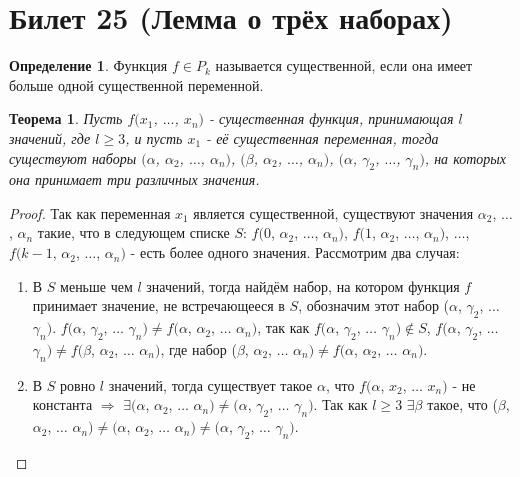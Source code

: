 \documentclass[a4paper, 12pt]{article}
\theoremstyle{definition}
\newtheorem*{definition}{Определение}
\theoremstyle{plain}
\newtheorem*{theorem}{Теорема}
\theoremstyle{remark}
\begin{document}
  \section{Билет 25 (Лемма о трёх наборах)}
  \begin{definition}
    Функция $f\in P_k$ называется существенной, если она имеет больше одной существенной переменной.
  \end{definition}
  \begin{theorem}
    Пусть $f(x_1$, $\ldots$, $x_n)$ - существенная функция, принимающая $l$ значений, где $l\geqslant3$, и пусть $x_1$ - её существенная переменная, тогда существуют наборы $(\alpha$, $\alpha_2$, $\ldots$, $\alpha_n)$, $(\beta$, $\alpha_2$, $\ldots$, $\alpha_n)$, $(\alpha$, $\gamma_2$, $\ldots$, $\gamma_n)$, на которых она принимает три различных значения.
  \end{theorem}
  \begin{proof}
    Так как переменная $x_1$ является существенной, существуют значения $\alpha_2$, $\ldots$, $\alpha_n$ такие, что в следующем списке $S$: $f(0$, $\alpha_2$, $\ldots$, $\alpha_n)$, $f(1$, $\alpha_2$, $\ldots$, $\alpha_n)$, $\ldots$, $f(k-1$, $\alpha_2$, $\ldots$, $\alpha_n)$ - есть более одного значения. Рассмотрим два случая:
    \begin{enumerate}
      \item В $S$ меньше чем $l$ значений, тогда найдём набор, на котором функция $f$ принимает значение, не встречающееся в $S$, обозначим этот набор ($\alpha$, $\gamma_2$, $\ldots$ $\gamma_n)$. $f(\alpha$, $\gamma_2$, $\ldots$ $\gamma_n)\neq f(\alpha$, $\alpha_2$, $\ldots$ $\alpha_n)$, так как $f(\alpha$, $\gamma_2$, $\ldots$ $\gamma_n)\notin S$, $f(\alpha$, $\gamma_2$, $\ldots$ $\gamma_n)\neq f(\beta$, $\alpha_2$, $\ldots$ $\alpha_n)$, где набор ($\beta$, $\alpha_2$, $\ldots$ $\alpha_n)\neq f(\alpha$, $\alpha_2$, $\ldots$ $\alpha_n)$.
      \item В $S$ ровно $l$ значений, тогда существует такое $\alpha$, что $f(\alpha$, $x_2$, $\ldots$ $x_n)$ - не константа $\Longrightarrow$ $\exists (\alpha$, $\alpha_2$, $\ldots$ $\alpha_n)\neq(\alpha$, $\gamma_2$, $\ldots$ $\gamma_n)$. Так как $l\geqslant3$ $\exists\beta$ такое, что ($\beta$, $\alpha_2$, $\ldots$ $\alpha_n)\neq(\alpha$, $\alpha_2$, $\ldots$ $\alpha_n)\neq(\alpha$, $\gamma_2$, $\ldots$ $\gamma_n)$.
    \end{enumerate}
  \end{proof}
\end{document}
